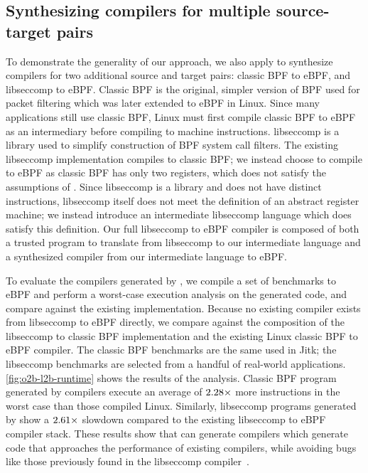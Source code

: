 \subsection{Synthesizing compilers for multiple source-target pairs}




To demonstrate the generality of our approach, we also apply \jitsynth to
synthesize compilers for two additional source and target pairs:
classic BPF to eBPF, and libseccomp to eBPF.
%
Classic BPF is the original, simpler version of BPF used for packet filtering which
was later extended to eBPF in Linux.
%
Since many applications still use classic BPF, Linux must first compile classic BPF
to eBPF as an intermediary before compiling to machine instructions.
%
libseccomp is a library used to simplify construction of BPF system call filters.
%
The existing libseccomp implementation compiles to classic BPF; we instead choose
to compile to eBPF as classic BPF has only two registers, which does not satisfy
the assumptions of \jitsynth.
%
Since libseccomp is a library and does not have distinct instructions, libseccomp itself does not meet the definition of an abstract register machine; we instead introduce
an intermediate libseccomp language which does satisfy this definition.
%
Our full libseccomp to eBPF compiler is composed of both a trusted program to translate from libseccomp to our intermediate language and a synthesized compiler from our intermediate language to eBPF.


To evaluate the compilers generated by \jitsynth, we compile a set of benchmarks
to eBPF and perform a worst-case execution analysis on the generated code, and
compare against the existing implementation.
%
Because no existing compiler exists from libseccomp to eBPF directly,
we compare against the composition of the libseccomp to classic BPF implementation and the
existing Linux classic BPF to eBPF compiler.
%
The classic BPF benchmarks are the same used in Jitk; the libseccomp benchmarks
are selected from a handful of real-world applications.
%
\autoref{fig:o2b-l2b-runtime} shows the results of the analysis.
%
Classic BPF program generated by \jitsynth compilers execute
an average of $2.28\times$ more instructions in the worst case
than those compiled Linux.
%
Similarly, libseccomp programs generated by \jitsynth show a
$2.61\times$ slowdown compared to the existing libseccomp
to eBPF compiler stack.
%
These results show that \jitsynth can generate compilers which generate
code that approaches the performance of existing compilers, while avoiding
bugs like those previously found in the libseccomp compiler~\cite{lsc:bug}.
%


